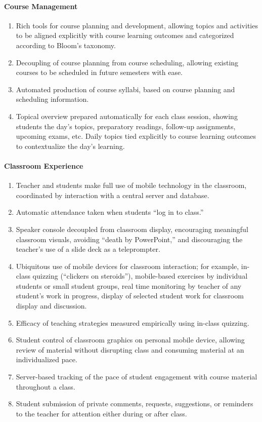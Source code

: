 \documentclass{article}
\begin{document}
\paragraph{Course Management}
\begin{enumerate}
\item Rich tools for course planning and development,
  allowing topics and activities
  to be aligned explicitly
  with course learning outcomes
  and categorized according to Bloom's taxonomy.
\item Decoupling of course planning from course scheduling, allowing existing
  courses to be scheduled in future semesters with ease.
\item Automated production of course syllabi, based on course planning and
  scheduling information.
\item
  Topical overview prepared automatically
  for each class session,
  showing students the day's topics,
  preparatory readings,
  follow-up assignments,
  upcoming exams, etc.
  Daily topics tied explicitly
  to course learning outcomes
  to contextualize the day's learning.
\end{enumerate}

\paragraph{Classroom Experience}
\begin{enumerate}
\item Teacher and students make full use of mobile technology in the classroom,
  coordinated by interaction with a central server and database.
\item Automatic attendance taken when students ``log in to class.''
\item Speaker console decoupled from classroom display,
  encouraging meaningful classroom visuals,
  avoiding ``death by PowerPoint,''
  and discouraging the
  teacher's use of a slide deck as a teleprompter.
\item Ubiquitous use of mobile devices for classroom interaction; for example,
  in-class quizzing (``clickers on steroids''), mobile-based exercises by
  individual students or small student groups, real time monitoring by teacher
  of any student's work in progress, display of selected student work for
  classroom display and discussion.
\item Efficacy of teaching strategies measured empirically using in-class
  quizzing.
\item Student control of classroom graphics on personal mobile device, allowing
  review of material without disrupting class and consuming material at an
  individualized pace.
\item Server-based tracking of the pace of student engagement
  with course material throughout a class.
\item Student submission of private comments, requests, suggestions,
  or reminders to the teacher for attention either during or after class.
\end{enumerate}
\end{document}
